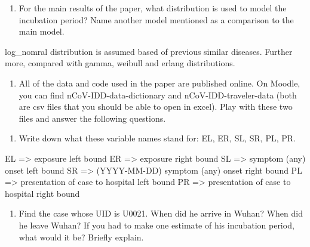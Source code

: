 \documentclass[
]{article}
\newenvironment{Shaded}{\begin{snugshade}}{\end{snugshade}}
\newcommand{\CommentTok}[1]{\textcolor[rgb]{0.56,0.35,0.01}{\textit{#1}}}
\newcommand{\KeywordTok}[1]{\textcolor[rgb]{0.13,0.29,0.53}{\textbf{#1}}}
\newcommand{\NormalTok}[1]{#1}
\newcommand{\OperatorTok}[1]{\textcolor[rgb]{0.81,0.36,0.00}{\textbf{#1}}}
\newcommand{\StringTok}[1]{\textcolor[rgb]{0.31,0.60,0.02}{#1}}
\providecommand{\tightlist}{%
  \setlength{\itemsep}{0pt}\setlength{\parskip}{0pt}}
\begin{document}
\begin{enumerate}
\def\labelenumi{(\arabic{enumi})}
\setcounter{enumi}{2}
\tightlist
\item
  For the main results of the paper, what distribution is used to model
  the incubation period? Name another model mentioned as a comparison to
  the main model.
\end{enumerate}

log\_nomral distribution is assumed based of previous similar diseases.
Further more, compared with gamma, weibull and erlang distributions.

\begin{enumerate}
\def\labelenumi{\arabic{enumi}.}
\setcounter{enumi}{2}
\tightlist
\item
  All of the data and code used in the paper are published online. On
  Moodle, you can find nCoV-IDD-data-dictionary and
  nCoV-IDD-traveler-data (both are csv files that you should be able to
  open in excel). Play with these two files and answer the following
  questions.
\end{enumerate}

\begin{Shaded}
\end{Shaded}

\begin{enumerate}
\def\labelenumi{(\arabic{enumi})}
\tightlist
\item
  Write down what these variable names stand for: EL, ER, SL, SR, PL,
  PR.
\end{enumerate}

EL =\textgreater{} exposure left bound ER =\textgreater{} exposure right
bound SL =\textgreater{} symptom (any) onset left bound SR
=\textgreater{} (YYYY-MM-DD) symptom (any) onset right bound PL
=\textgreater{} presentation of case to hospital left bound PR
=\textgreater{} presentation of case to hospital right bound

\begin{enumerate}
\def\labelenumi{(\arabic{enumi})}
\setcounter{enumi}{1}
\tightlist
\item
  Find the case whose UID is U0021. When did he arrive in Wuhan? When
  did he leave Wuhan? If you had to make one estimate of his incubation
  period, what would it be? Briefly explain.
\end{enumerate}
\end{document}
